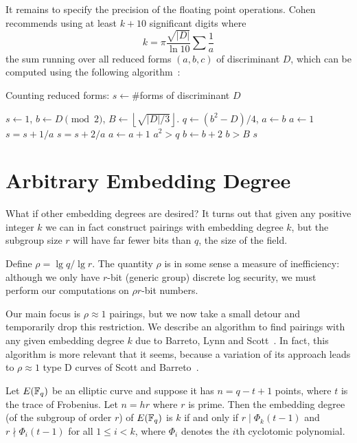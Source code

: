 It remains to specify the precision of the floating point operations.
Cohen recommends using at least $k + 10$ significant digits where
\[ k = \pi \frac{\sqrt{|D|}} {\ln 10} \sum \frac{1}{a} \]
the sum running over all reduced forms $(a,b,c)$ of discriminant $D$,
which can be computed using the following algorithm~\cite[Algorithm 5.3.5]{1993-cohen}:

\begin{algorithm}
\caption {Counting reduced forms: $s \gets \#$forms of discriminant $D$}
\begin{algorithmic}[1]
\STATE $s\gets 1$, $b\gets D \pmod 2$, $B\gets \left\lfloor \sqrt{|D|/3}
\right\rfloor$.
\REPEAT
    \REPEAT
	\STATE $q\gets (b^2 - D)/4$, $a\gets b$
	    \STATE $a\gets 1$
		\STATE $s=s+1/a$
	    \ELSE
		\STATE $s=s+2/a$
	    \ENDIF
	\ENDIF
	\STATE $a\gets a+1$
    \UNTIL $a^2>q$
    \STATE $b\gets b+2$
\UNTIL $b>B$
\RETURN $s$
\end{algorithmic}
\end{algorithm}

\section {\label{sec:balscurves}Arbitrary Embedding Degree}

What if other embedding degrees are desired? It turns out that given any
positive integer $k$ we can in fact construct pairings with embedding
degree $k$, but the subgroup size $r$ will have far fewer bits than $q$,
the size of the field.

Define $\rho = \lg q / \lg r$. The quantity $\rho$ is in some sense
a measure of inefficiency: although we only have $r$-bit (generic group)
discrete log security, we must perform our computations on $\rho r$-bit numbers.

Our main focus is $\rho \approx 1$ pairings, but we now take a small detour and
temporarily drop this restriction. We describe an algorithm to find pairings
with any given embedding degree $k$ due to Barreto, Lynn and Scott~\cite{bals}.
In fact, this algorithm is more relevant that it seems, because a variation of
its approach leads to $\rho \approx 1$ type D curves of Scott and
Barreto~\cite{moremnt}.

\begin{lemma}
Let $E(\mathbb{F}_q)$ be an elliptic curve and suppose it has
$n = q - t + 1$ points, where $t$ is the trace of Frobenius.
Let $n = h r$ where $r$ is prime.
Then the embedding degree (of the subgroup of order $r$) of $E(\mathbb{F}_q)$ is $k$
if and only if
$r \mid \Phi_k(t-1)$ and $r \nmid \Phi_i(t-1)$ for all $1 \le i < k$,
where $\Phi_i$ denotes the $i$th cyclotomic polynomial.
\end{lemma}


